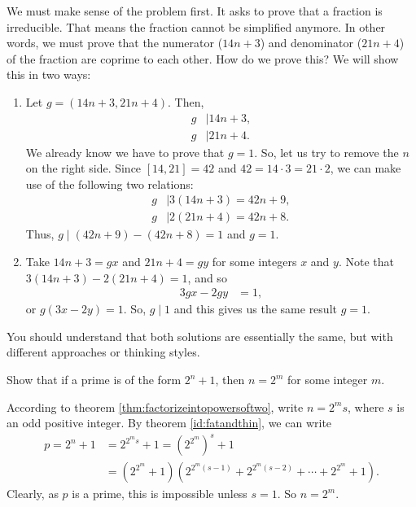 \documentclass{subfile}
\begin{document}
	\begin{solution}
		We must make sense of the problem first. It asks to prove that a fraction is irreducible. That means the fraction cannot be simplified anymore. In other words, we must prove that the numerator ($14n+3$) and denominator ($21n+4$) of the fraction are coprime to each other. How do we prove this? We will show this in two ways:
		\begin{enumerate}
			\item Let $g=(14n+3,21n+4)$. Then,
			\begin{align*}
				g & \mid 14n+3,\\
				g & \mid 21n+4.
			\end{align*}
		We already know we have to prove that $g=1$. So, let us try to remove the $n$ on the right side. Since $[14,21]=42$ and $42=14\cdot3=21\cdot2$, we can make use of the following two relations:
			\begin{align*}
				g & \mid 3(14n+3) = 42n+9,\\
				g & \mid  2(21n+4)= 42n+8.
			\end{align*}
		Thus, $g\mid (42n+9)-(42n+8)=1$ and $g=1$.

			\item Take $14n+3=gx$ and $21n+4=gy$ for some integers $x$ and $y$. Note that $3(14n+3)-2(21n+4) = 1$, and so
			\begin{align*}
				 3gx-2gy  & = 1,
			\end{align*}
		or $g(3x-2y) = 1.$ So, $g\mid 1$ and this gives us the same result $g=1$.
		\end{enumerate}
	\end{solution}

	\begin{remark}
		You should understand that both solutions are essentially the same, but with different approaches or thinking styles.
	\end{remark}

	\begin{problem}\label{prob:prime=poweroftwoplusone}
		Show that if a prime is of the form $2^n+1$, then $n=2^m$ for some integer $m$.
	\end{problem}

	\begin{solution}
		According to theorem \eqref{thm:factorizeintopowersoftwo}, write $n=2^ms$, where $s$ is an odd positive integer. By theorem \eqref{id:fatandthin}, we can write
			\begin{align*}
				p = 2^n+1 &= 2^{2^{m}s}+1 = \left(2^{2^{m}}\right)^s+1\\
				   		  &=\left(2^{2^m}+1\right)\left(2^{2^{m}(s-1)}+2^{2^{m}(s-2)}+ \cdots + 2^{2^{m}}+1\right).
			\end{align*}
		Clearly, as $p$ is a prime, this is impossible unless $s=1$. So $n=2^m$.
	\end{solution}
\end{document}
